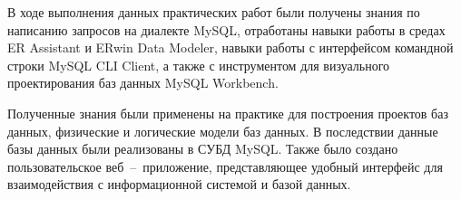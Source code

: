 \Conclusion %

В ходе выполнения данных практических работ были получены знания по написанию запросов на диалекте MySQL, отработаны навыки работы в средах ER Assistant и ERwin Data Modeler, навыки работы с интерфейсом командной строки MySQL CLI Client, а также с инструментом для визуального проектирования баз данных MySQL Workbench. 

Полученные знания были применены на практике для построения проектов баз данных, физические и логические модели баз данных. В последствии данные базы данных были реализованы в СУБД MySQL. Также было создано пользовательское веб~--~приложение, представляющее удобный интерфейс для взаимодействия с информационной системой и базой данных.

